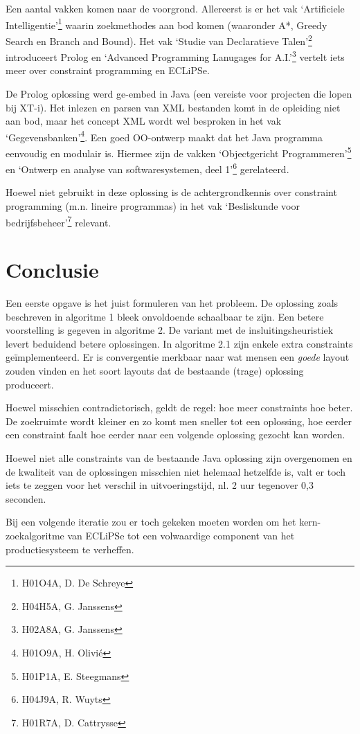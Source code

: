 \documentclass[a4paper,12pt]{report}
\begin{document}
Een aantal vakken komen naar de voorgrond. Allereerst is er het vak `Artificiele Intelligentie'\footnote{H01O4A, D. De Schreye} waarin zoekmethodes aan bod komen (waaronder A*, Greedy Search en Branch and Bound). Het vak `Studie van Declaratieve Talen'\footnote{H04H5A, G. Janssens} introduceert Prolog en `Advanced Programming Lanugages for A.I.'\footnote{H02A8A, G. Janssens} vertelt iets meer over constraint programming en ECLiPSe.

De Prolog oplossing werd ge-embed in Java (een vereiste voor projecten die lopen bij XT-i). Het inlezen en parsen van XML bestanden komt in de opleiding niet aan bod, maar het concept XML wordt wel besproken in het vak `Gegevensbanken'\footnote{H01O9A, H. Olivié}. Een goed OO-ontwerp maakt dat het Java programma eenvoudig en modulair is. Hiermee zijn de vakken `Objectgericht Programmeren'\footnote{H01P1A, E. Steegmans} en `Ontwerp en analyse van softwaresystemen, deel 1'\footnote{H04J9A, R. Wuyts} gerelateerd.

Hoewel niet gebruikt in deze oplossing is de achtergrondkennis over constraint programming (m.n. lineire programmas) in het vak `Besliskunde voor bedrijfsbeheer'\footnote{H01R7A, D. Cattrysse} relevant.

\chapter{Conclusie}
Een eerste opgave is het juist formuleren van het probleem. De oplossing zoals beschreven in algoritme 1 bleek onvoldoende schaalbaar te zijn. Een betere voorstelling is gegeven in algoritme 2. De variant met de insluitingsheuristiek levert beduidend betere oplossingen. In algoritme 2.1 zijn enkele extra constraints geïmplementeerd. Er is convergentie merkbaar naar wat mensen een \textit{goede} layout zouden vinden en het soort layouts dat de bestaande (trage) oplossing produceert.

Hoewel misschien contradictorisch, geldt de regel: hoe meer constraints hoe beter. De zoekruimte wordt kleiner en zo komt men sneller tot een oplossing, hoe eerder een constraint faalt hoe eerder naar een volgende oplossing gezocht kan worden.

Hoewel niet alle constraints van de bestaande Java oplossing zijn overgenomen en de kwaliteit van de oplossingen misschien niet helemaal hetzelfde is, valt er toch iets te zeggen voor het verschil in uitvoeringstijd, nl. 2 uur tegenover 0,3 seconden.

Bij een volgende iteratie zou er toch gekeken moeten worden om het kern-zoekalgoritme van ECLiPSe tot een volwaardige component van het productiesysteem te verheffen.
\end{document}
